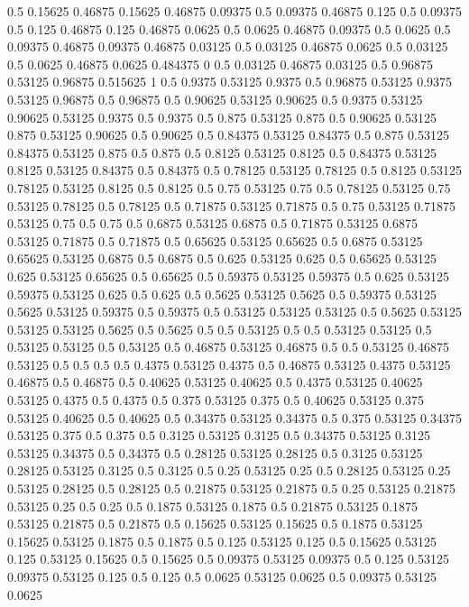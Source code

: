 0.5 0.15625
0.46875 0.15625
0.46875 0.09375
0.5 0.09375
0.46875 0.125
0.5 0.09375
0.5 0.125
0.46875 0.125
0.46875 0.0625
0.5 0.0625
0.46875 0.09375
0.5 0.0625
0.5 0.09375
0.46875 0.09375
0.46875 0.03125
0.5 0.03125
0.46875 0.0625
0.5 0.03125
0.5 0.0625
0.46875 0.0625
0.484375 0
0.5 0.03125
0.46875 0.03125
0.5 0.96875
0.53125 0.96875
0.515625 1
0.5 0.9375
0.53125 0.9375
0.5 0.96875
0.53125 0.9375
0.53125 0.96875
0.5 0.96875
0.5 0.90625
0.53125 0.90625
0.5 0.9375
0.53125 0.90625
0.53125 0.9375
0.5 0.9375
0.5 0.875
0.53125 0.875
0.5 0.90625
0.53125 0.875
0.53125 0.90625
0.5 0.90625
0.5 0.84375
0.53125 0.84375
0.5 0.875
0.53125 0.84375
0.53125 0.875
0.5 0.875
0.5 0.8125
0.53125 0.8125
0.5 0.84375
0.53125 0.8125
0.53125 0.84375
0.5 0.84375
0.5 0.78125
0.53125 0.78125
0.5 0.8125
0.53125 0.78125
0.53125 0.8125
0.5 0.8125
0.5 0.75
0.53125 0.75
0.5 0.78125
0.53125 0.75
0.53125 0.78125
0.5 0.78125
0.5 0.71875
0.53125 0.71875
0.5 0.75
0.53125 0.71875
0.53125 0.75
0.5 0.75
0.5 0.6875
0.53125 0.6875
0.5 0.71875
0.53125 0.6875
0.53125 0.71875
0.5 0.71875
0.5 0.65625
0.53125 0.65625
0.5 0.6875
0.53125 0.65625
0.53125 0.6875
0.5 0.6875
0.5 0.625
0.53125 0.625
0.5 0.65625
0.53125 0.625
0.53125 0.65625
0.5 0.65625
0.5 0.59375
0.53125 0.59375
0.5 0.625
0.53125 0.59375
0.53125 0.625
0.5 0.625
0.5 0.5625
0.53125 0.5625
0.5 0.59375
0.53125 0.5625
0.53125 0.59375
0.5 0.59375
0.5 0.53125
0.53125 0.53125
0.5 0.5625
0.53125 0.53125
0.53125 0.5625
0.5 0.5625
0.5 0.5
0.53125 0.5
0.5 0.53125
0.53125 0.5
0.53125 0.53125
0.5 0.53125
0.5 0.46875
0.53125 0.46875
0.5 0.5
0.53125 0.46875
0.53125 0.5
0.5 0.5
0.5 0.4375
0.53125 0.4375
0.5 0.46875
0.53125 0.4375
0.53125 0.46875
0.5 0.46875
0.5 0.40625
0.53125 0.40625
0.5 0.4375
0.53125 0.40625
0.53125 0.4375
0.5 0.4375
0.5 0.375
0.53125 0.375
0.5 0.40625
0.53125 0.375
0.53125 0.40625
0.5 0.40625
0.5 0.34375
0.53125 0.34375
0.5 0.375
0.53125 0.34375
0.53125 0.375
0.5 0.375
0.5 0.3125
0.53125 0.3125
0.5 0.34375
0.53125 0.3125
0.53125 0.34375
0.5 0.34375
0.5 0.28125
0.53125 0.28125
0.5 0.3125
0.53125 0.28125
0.53125 0.3125
0.5 0.3125
0.5 0.25
0.53125 0.25
0.5 0.28125
0.53125 0.25
0.53125 0.28125
0.5 0.28125
0.5 0.21875
0.53125 0.21875
0.5 0.25
0.53125 0.21875
0.53125 0.25
0.5 0.25
0.5 0.1875
0.53125 0.1875
0.5 0.21875
0.53125 0.1875
0.53125 0.21875
0.5 0.21875
0.5 0.15625
0.53125 0.15625
0.5 0.1875
0.53125 0.15625
0.53125 0.1875
0.5 0.1875
0.5 0.125
0.53125 0.125
0.5 0.15625
0.53125 0.125
0.53125 0.15625
0.5 0.15625
0.5 0.09375
0.53125 0.09375
0.5 0.125
0.53125 0.09375
0.53125 0.125
0.5 0.125
0.5 0.0625
0.53125 0.0625
0.5 0.09375
0.53125 0.0625
